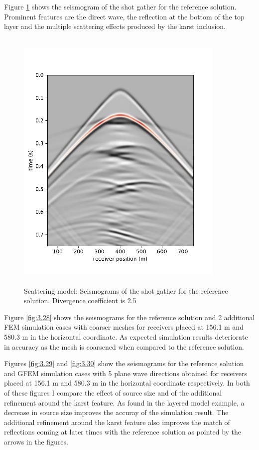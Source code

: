 \clearpage
Figure \ref{fig:3.27} shows the seismogram of the shot gather for the reference solution. Prominent features are the direct wave, the reflection at the bottom of the top layer and the multiple scattering effects produced by the karst inclusion.
 \begin{figure}[h!]
	\centering
	\includegraphics[width=10cm, height=13cm]{Thesis_Edith/figures/scattering/scat_waves/seismogram_scattering.pdf}
	\caption{Scattering model: Seismograms of the shot gather for the reference solution. Divergence coefficient is 2.5}
	\label{fig:3.27}
\end{figure}

\clearpage
Figure \ref{fig:3.28} shows the seismograms for the reference solution and 2 additional FEM simulation cases with coarser meshes for receivers placed at 156.1 m and 580.3 m in the horizontal coordinate. As expected simulation results deteriorate in accuracy as the mesh is coarsened when compared to the reference solution.

Figures \ref{fig:3.29} and \ref{fig:3.30} show the seismograms for the reference solution and GFEM simulation cases with 5 plane wave directions obtained for receivers placed at 156.1 m and 580.3 m in the horizontal coordinate respectively. In both of these figures I compare the effect of source size and of the additional refinement around the karst feature. As found in the layered model example, a decrease in source size improves the accuray of the simulation result. The additional refinement around the karst feature also improves the match of reflections coming at later times with the reference solution as pointed by the arrows in the figures.

